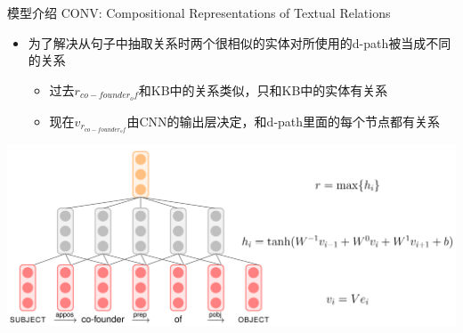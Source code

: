 \documentclass[color=usenames,dvipsnames]{beamer}
\begin{document}
\begin{frame}{模型介绍}
 CONV: Compositional Representations of Textual Relations
 \begin{itemize}
  \item 为了解决从句子中抽取关系时两个很相似的实体对所使用的d-path被当成不同的关系
    \begin{itemize}
     \item 过去$r_{co-founder_of}$和KB中的关系类似，只和KB中的实体有关系
     \item 现在$v_{r_{co-founder_of}}$由CNN的输出层决定，和d-path里面的每个节点都有关系
    \end{itemize}
 \end{itemize}
   \includegraphics[width=0.85\hsize]{pic/conv.png}
\end{frame}



\end{document}
